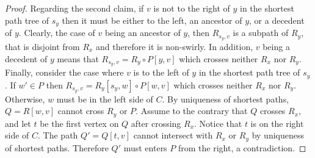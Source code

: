 \documentclass{article}
\begin{document}
\begin{proof}
    Regarding the second claim, if $v$ is not to the right of $y$ in the shortest path  tree of $s_y$ then it must be either to the left, an ancestor of $y$, or a decedent of $y$.
    Clearly, the case of $v$ being an ancestor of $y$, then $R_{s_y,v}$ is a subpath of $R_y$, that is disjoint from $R_x$ and therefore it is non-swirly.
    In addition, $v$ being a decedent of $y$ means that $R_{s_y,v}=R_y\circ P[y,v]$ which crosses neither $R_x$ nor $R_y$.
    Finally, consider the case where $v$ is to the left of $y$ in the shortest path tree of $s_y$.
    If $w'\in P$ then $R_{s_y,v}=R_y[s_y,w]\circ P[w,v]$ which crosses neither $R_x$ nor $R_y$.
    Otherwise, $w$ must be in the left side of $C$.
    By uniqueness of shortest paths, $Q=R[w,v]$ cannot cross $R_y$ or $P$.
    Assume to the contrary that $Q$ crosses $R_x$, and let $t$ be the first vertex on $Q$ after crossing $R_x$.
    Notice that $t$ is on the right side of $C$.
    The path $Q'=Q[t,v]$ cannot intersect with $R_x$ or $R_y$ by uniqueness of shortest paths.
    Therefore $Q'$ must enters $P$ from the right, a contradiction.
\end{proof}
\end{document}
